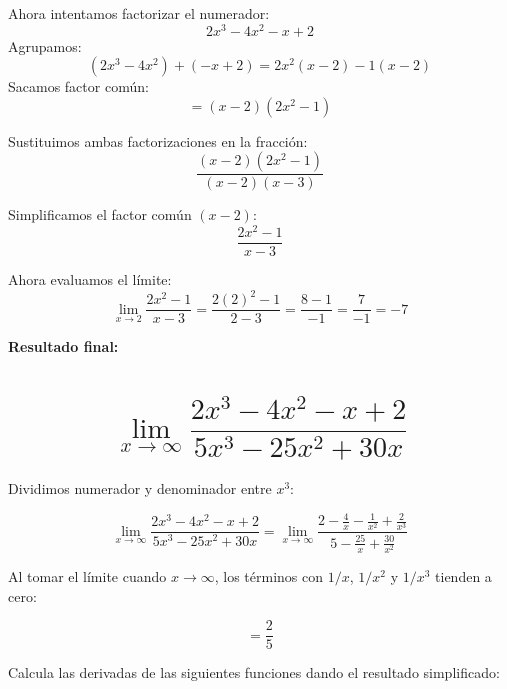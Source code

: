\documentclass[spanish, 11pt]{exam}
\begin{document}
\begin{questions}
\begin{multicols}{2}
\begin{parts}
\begin{solution}
    Ahora intentamos factorizar el numerador:
    \[
    2x^3 - 4x^2 - x + 2
    \]
    Agrupamos:
    \[
    (2x^3 - 4x^2) + (-x + 2) = 2x^2(x - 2) -1(x - 2)
    \]
    Sacamos factor común:
    \[
    = (x - 2)(2x^2 - 1)
    \]

    Sustituimos ambas factorizaciones en la fracción:
    \[
    \frac{(x - 2)(2x^2 - 1)}{(x - 2)(x - 3)}
    \]

    Simplificamos el factor común \( (x - 2) \):
    \[
    \frac{2x^2 - 1}{x - 3}
    \]

    Ahora evaluamos el límite:
    \[
    \lim_{x \to 2} \frac{2x^2 - 1}{x - 3} = \frac{2(2)^2 - 1}{2 - 3} = \frac{8 - 1}{-1} = \frac{7}{-1} = -7
    \]

    \textbf{Resultado final:} 
    \end{solution}

    \part {$$\lim_{x \to \infty} \dfrac{2x^3 - 4x^2 - x + 2}{5x^3 - 25x^2 + 30x}$$}

    \begin{solution}
    Dividimos numerador y denominador entre $x^3$:
    
    \[
    \lim_{x \to \infty} \frac{2x^3 - 4x^2 - x + 2}{5x^3 - 25x^2 + 30x}
    = \lim_{x \to \infty} \frac{2 - \frac{4}{x} - \frac{1}{x^2} + \frac{2}{x^3}}{5 - \frac{25}{x} + \frac{30}{x^2}}
    \]
    
    Al tomar el límite cuando $x \to \infty$, los términos con $1/x$, $1/x^2$ y $1/x^3$ tienden a cero:
    
    \[
    = \frac{2}{5}
    \]
    \end{solution}
\end{parts}
    
\end{multicols}

\question[2] Calcula las derivadas de las siguientes funciones dando el resultado simplificado:
\begin{multicols}{2}
\end{multicols}
\end{questions}
\end{document}
